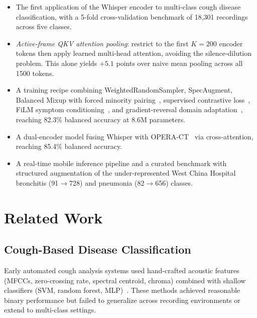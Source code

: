 \documentclass[10pt,journal,compsoc]{IEEEtran}
\begin{document}
\begin{itemize}
    \item The first application of the Whisper encoder to multi-class cough
    disease classification, with a 5-fold cross-validation benchmark
    of 18{,}301 recordings across five classes.

    \item \textit{Active-frame QKV attention pooling}: restrict to the
    first $K\!=\!200$ encoder tokens then apply learned multi-head attention,
    avoiding the silence-dilution problem. This alone yields $+5.1$ points
    over naive mean pooling across all 1500 tokens.

    \item A training recipe combining WeightedRandomSampler, SpecAugment,
    Balanced Mixup with forced minority pairing~\cite{balanced_mixup},
    supervised contrastive loss~\cite{supcon}, FiLM symptom
    conditioning~\cite{film}, and gradient-reversal domain
    adaptation~\cite{dann}, reaching 82.3\% balanced accuracy at 8.6M
    parameters.

    \item A dual-encoder model fusing Whisper with OPERA-CT~\cite{opera}
    via cross-attention, reaching 85.4\% balanced accuracy.

    \item A real-time mobile inference pipeline and a curated benchmark
    with structured augmentation of the under-represented West China
    Hospital bronchitis (91$\to$728) and pneumonia (82$\to$656) classes.
\end{itemize}

\section{Related Work}
\label{sec:related}

\subsection{Cough-Based Disease Classification}

Early automated cough analysis systems used hand-crafted acoustic features
(MFCCs, zero-crossing rate, spectral centroid, chroma) combined with
shallow classifiers (SVM, random forest, MLP)~\cite{cough_svm}. These
methods achieved reasonable binary performance but failed to generalize
across recording environments or extend to multi-class settings.
\end{document}
